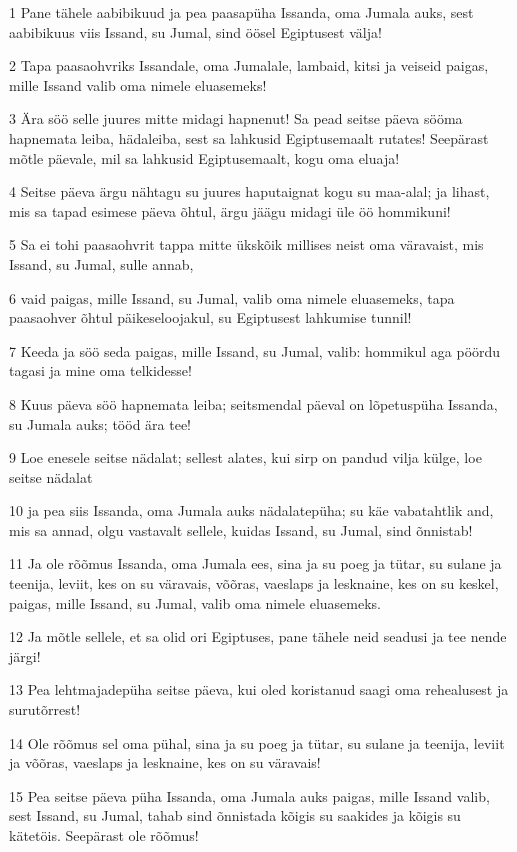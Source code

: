 \par 1 Pane tähele aabibikuud ja pea paasapüha Issanda, oma Jumala auks, sest aabibikuus viis Issand, su Jumal, sind öösel Egiptusest välja!
\par 2 Tapa paasaohvriks Issandale, oma Jumalale, lambaid, kitsi ja veiseid paigas, mille Issand valib oma nimele eluasemeks!
\par 3 Ära söö selle juures mitte midagi hapnenut! Sa pead seitse päeva sööma hapnemata leiba, hädaleiba, sest sa lahkusid Egiptusemaalt rutates! Seepärast mõtle päevale, mil sa lahkusid Egiptusemaalt, kogu oma eluaja!
\par 4 Seitse päeva ärgu nähtagu su juures haputaignat kogu su maa-alal; ja lihast, mis sa tapad esimese päeva õhtul, ärgu jäägu midagi üle öö hommikuni!
\par 5 Sa ei tohi paasaohvrit tappa mitte ükskõik millises neist oma väravaist, mis Issand, su Jumal, sulle annab,
\par 6 vaid paigas, mille Issand, su Jumal, valib oma nimele eluasemeks, tapa paasaohver õhtul päikeseloojakul, su Egiptusest lahkumise tunnil!
\par 7 Keeda ja söö seda paigas, mille Issand, su Jumal, valib: hommikul aga pöördu tagasi ja mine oma telkidesse!
\par 8 Kuus päeva söö hapnemata leiba; seitsmendal päeval on lõpetuspüha Issanda, su Jumala auks; tööd ära tee!
\par 9 Loe enesele seitse nädalat; sellest alates, kui sirp on pandud vilja külge, loe seitse nädalat
\par 10 ja pea siis Issanda, oma Jumala auks nädalatepüha; su käe vabatahtlik and, mis sa annad, olgu vastavalt sellele, kuidas Issand, su Jumal, sind õnnistab!
\par 11 Ja ole rõõmus Issanda, oma Jumala ees, sina ja su poeg ja tütar, su sulane ja teenija, leviit, kes on su väravais, võõras, vaeslaps ja lesknaine, kes on su keskel, paigas, mille Issand, su Jumal, valib oma nimele eluasemeks.
\par 12 Ja mõtle sellele, et sa olid ori Egiptuses, pane tähele neid seadusi ja tee nende järgi!
\par 13 Pea lehtmajadepüha seitse päeva, kui oled koristanud saagi oma rehealusest ja surutõrrest!
\par 14 Ole rõõmus sel oma pühal, sina ja su poeg ja tütar, su sulane ja teenija, leviit ja võõras, vaeslaps ja lesknaine, kes on su väravais!
\par 15 Pea seitse päeva püha Issanda, oma Jumala auks paigas, mille Issand valib, sest Issand, su Jumal, tahab sind õnnistada kõigis su saakides ja kõigis su kätetöis. Seepärast ole rõõmus!
